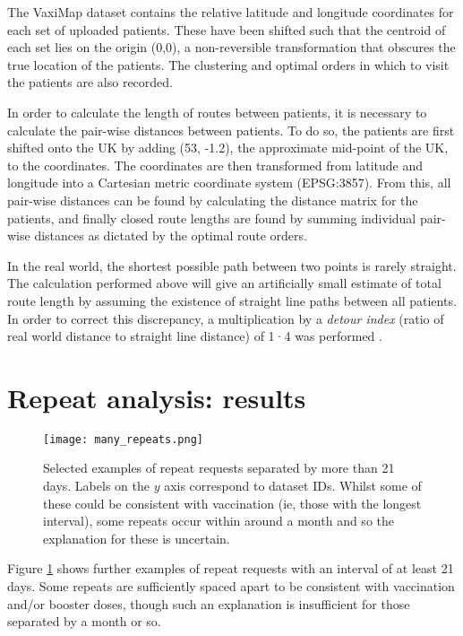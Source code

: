 \documentclass[review]{elsarticle}
\def\vm{VaxiMap}
\begin{document}
The \vm{} dataset contains the relative latitude and longitude coordinates for each set of uploaded patients. These have been shifted such that the centroid of each set lies on the origin (0,0), a non-reversible transformation that obscures the true location of the patients. The clustering and optimal orders in which to visit the patients are also recorded. 

In order to calculate the length of routes between patients, it is necessary to calculate the pair-wise distances between patients. To do so, the patients are first shifted onto the UK by adding (53, -1.2), the approximate mid-point of the UK, to the coordinates. The coordinates are then transformed from latitude and longitude into a Cartesian metric coordinate system (EPSG:3857). From this, all pair-wise distances can be found by calculating the distance matrix for the patients, and finally closed route lengths are found by summing individual pair-wise distances as dictated by the optimal route orders. 

In the real world, the shortest possible path between two points is rarely straight. The calculation performed above will give an artificially small estimate of total route length by assuming the existence of straight line paths between all patients. In order to correct this discrepancy, a multiplication by a \textit{detour index} (ratio of real world distance to straight line distance) of 1·4 was performed \cite{Cole1968}. 

\section{Repeat analysis: results}

\begin{figure}[H]
\centering
\texttt{[image: many\_repeats.png]}
\caption{Selected examples of repeat requests separated by more than 21 days. Labels on the $y$ axis correspond to dataset IDs. Whilst some of these could be consistent with vaccination (ie, those with the longest interval), some repeats occur within around a month and so the explanation for these is uncertain.}
\label{many_repeats}
\end{figure}

Figure \ref{many_repeats} shows further examples of repeat requests with an interval of at least 21 days. Some repeats are sufficiently spaced apart to be consistent with vaccination and/or booster doses, though such an explanation is insufficient for those separated by a month or so. 



\end{document}
